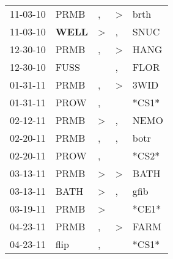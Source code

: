 \begin{supertabular}{p{0.07\textwidth}p{0.06\textwidth}p{0.02\textwidth}p{0.02\textwidth}p{0.06\textwidth}}
          11-03-10\textsuperscript{} &           PRMB\textsuperscript{} &                , &     \textgreater &           brth\textsuperscript{} \\
          11-03-10\textsuperscript{} &  \textbf{WELL\textsuperscript{}} &     \textgreater &                , &           SNUC\textsuperscript{} \\
          12-30-10\textsuperscript{} &           PRMB\textsuperscript{} &                , &     \textgreater &           HANG\textsuperscript{} \\
          12-30-10\textsuperscript{} &           FUSS\textsuperscript{} &                  &                , &           FLOR\textsuperscript{} \\
          01-31-11\textsuperscript{} &           PRMB\textsuperscript{} &                , &     \textgreater &           3WID\textsuperscript{} \\
          01-31-11\textsuperscript{} &           PROW\textsuperscript{} &                , &                  &                            *CS1* \\
          02-12-11\textsuperscript{} &           PRMB\textsuperscript{} &     \textgreater &                , &           NEMO\textsuperscript{} \\
          02-20-11\textsuperscript{} &           PRMB\textsuperscript{} &                , &                , &           botr\textsuperscript{} \\
          02-20-11\textsuperscript{} &           PROW\textsuperscript{} &                , &                  &                            *CS2* \\
          03-13-11\textsuperscript{} &           PRMB\textsuperscript{} &     \textgreater &     \textgreater &           BATH\textsuperscript{} \\
          03-13-11\textsuperscript{} &           BATH\textsuperscript{} &     \textgreater &                , &           gfib\textsuperscript{} \\
          03-19-11\textsuperscript{} &           PRMB\textsuperscript{} &     \textgreater &                  &                            *CE1* \\
          04-23-11\textsuperscript{} &           PRMB\textsuperscript{} &                , &     \textgreater &           FARM\textsuperscript{} \\
          04-23-11\textsuperscript{} &           flip\textsuperscript{} &                , &                  &                            *CS1* \\

\end{supertabular}
